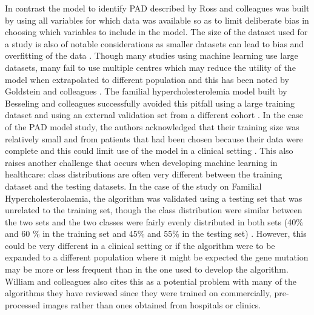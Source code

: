 In contrast the model to identify PAD described by Ross and colleagues \citep{Ross:2016kh} was built by using all variables for which data was available so as to limit deliberate bias in choosing which variables to include in the model.\newline
The size of the dataset used for a study is also of notable considerations as smaller datasets can lead to bias and overfitting  of the data \citep{Steyerberg:2003fq}. Though many studies using machine learning use large datasets, many fail to use multiple centres which may reduce the utility of the model when extrapolated to different population and this has been noted by Goldstein and colleagues \citep{Goldstein:2017bk}. The familial hypercholesterolemia model built by Besseling and colleagues successfully avoided this pitfall using a large training dataset and using an external validation set from a different cohort \citep{Besseling:2017bs}. In the case of the PAD model study, the authors acknowledged that their training size was relatively small and from patients that had been chosen because their data were complete and this could limit use of the model in a clinical setting \citep{Ross:2016kh}.\newline
This also raises another challenge that occurs when developing machine learning in healthcare: class distributions are often very different between the training dataset and the testing datasets. In the case of the study on Familial Hypercholesterolaemia, the algorithm was validated using a testing set that was unrelated to the training set, though the class distribution were similar between the two sets and the two classes were fairly evenly distributed in both sets (40\% and 60 \% in the training set and 45\% and 55\% in the testing set) \citep{Besseling:2017bs}. However, this could be very different in a clinical setting or if the algorithm were to be expanded to a different population where it might be expected the gene mutation may be more or less frequent than in the one used to develop the algorithm. William and colleagues also cites this as a potential problem with many of the algorithms they have reviewed \citep{William:2018ia} since they were trained on commercially, pre-processed images rather than ones obtained from hospitals or clinics.


